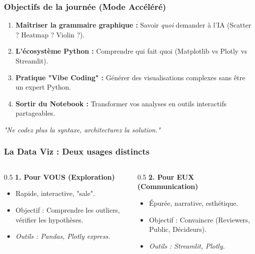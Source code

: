 \begin{frame}\frametitle{Objectifs de la journée (Mode Accéléré)}
   \begin{enumerate}
      \item \textbf{Maîtriser la grammaire graphique :} Savoir \textit{quoi} demander à l'IA (Scatter ? Heatmap ? Violin ?).
      \item \textbf{L'écosystème Python :} Comprendre qui fait quoi (Matplotlib vs Plotly vs Streamlit).
      \item \textbf{Pratique "Vibe Coding" :} Générer des visualisations complexes sans être un expert Python.
      \item \textbf{Sortir du Notebook :} Transformer vos analyses en outils interactifs partageables.
   \end{enumerate}
   \begin{center}
       \textit{"Ne codez plus la syntaxe, architecturez la solution."}
   \end{center}
\end{frame}

\begin{frame}\frametitle{La Data Viz : Deux usages distincts}
   \begin{columns}
       \begin{column}{0.5\textwidth}
           \textbf{1. Pour VOUS (Exploration)}
           \begin{itemize}
               \item Rapide, interactive, "sale".
               \item Objectif : Comprendre les outliers, vérifier les hypothèses.
               \item \textit{Outils : Pandas, Plotly express.}
           \end{itemize}
       \end{column}
       \begin{column}{0.5\textwidth}
           \textbf{2. Pour EUX (Communication)}
           \begin{itemize}
               \item Épurée, narrative, esthétique.
               \item Objectif : Convaincre (Reviewers, Public, Décideurs).
               \item \textit{Outils : Streamlit, Plotly.}
           \end{itemize}
       \end{column}
   \end{columns}
\end{frame}

